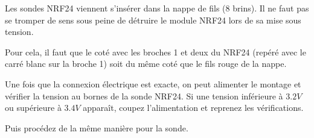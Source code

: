 Les sondes NRF24 viennent s'insérer dans la nappe de fils (8 brins). Il ne faut pas se tromper de sens sous peine de détruire le module NRF24 lors de sa mise sous tension.

Pour cela, il faut que le coté avec les broches 1 et deux du NRF24 (repéré avec le carré blanc sur la broche 1) soit du même coté que le fils rouge de la nappe.



Une fois que la connexion électrique est exacte, on peut alimenter le montage et vérifier la tension au bornes de la sonde NRF24.
Si une tension inférieure à $3.2V$ ou supérieure à $3.4V$ apparaît, coupez l'alimentation et reprenez les vérifications.

Puis procédez de la même manière pour la sonde.


